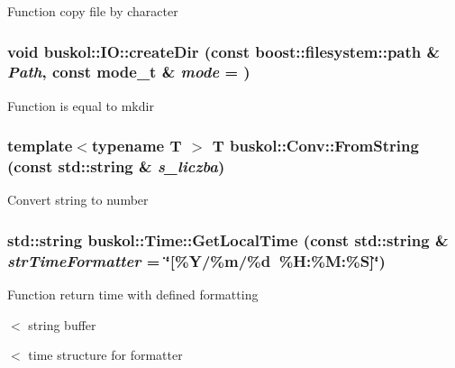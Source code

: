 \label{group__libbuskol_gafbb450f6ce225235ad7ccab77883aa18}
Function copy file by character \hypertarget{group__libbuskol_ga7dbaadfa6e4b5ba4a815651e5cfadde9}{
\subsubsection[{createDir}]{\setlength{\rightskip}{0pt plus 5cm}void buskol::IO::createDir (const boost::filesystem::path \& {\em Path}, \/  const mode\_\-t \& {\em mode} = {})}}
\label{group__libbuskol_ga7dbaadfa6e4b5ba4a815651e5cfadde9}
Function is equal to mkdir \hypertarget{group__libbuskol_ga6a7a5f3c569284e39dbfea446ffa7037}{
\subsubsection[{FromString}]{\setlength{\rightskip}{0pt plus 5cm}template$<$typename T $>$ T buskol::Conv::FromString (const std::string \& {\em s\_\-liczba})}}
\label{group__libbuskol_ga6a7a5f3c569284e39dbfea446ffa7037}
Convert string to number \hypertarget{group__libbuskol_ga87e1c767f9a8af7b2d13eb977d60d872}{
\subsubsection[{GetLocalTime}]{\setlength{\rightskip}{0pt plus 5cm}std::string buskol::Time::GetLocalTime (const std::string \& {\em strTimeFormatter} = {\ttfamily \char`\"{}\mbox{[}\%Y/\%m/\%d~\%H:\%M:\%S\mbox{]}\char`\"{}})}}
\label{group__libbuskol_ga87e1c767f9a8af7b2d13eb977d60d872}
Function return time with defined formatting 

$<$ string buffer

$<$ time structure for formatter 

